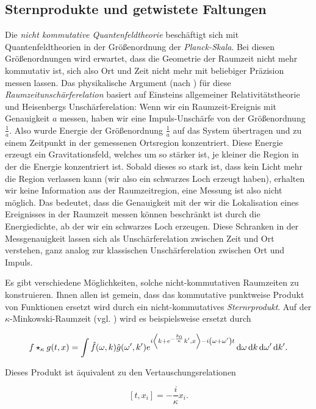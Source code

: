 \subsection{Sternprodukte und getwistete Faltungen}
Die \emph{nicht kommutative Quantenfeldtheorie} beschäftigt sich mit Quantenfeldtheorien in der Größenordnung der \emph{Planck-Skala}. Bei diesen Größenordnungen wird erwartet, dass die Geometrie der Raumzeit nicht mehr kommutativ ist, sich also Ort und Zeit nicht mehr mit beliebiger Präzision messen lassen. Das physikalische Argument (nach \textcite{Doplicher1995}) für diese \emph{Raumzeitunschärferelation} basiert auf Einsteins allgemeiner Relativitätstheorie und Heisenbergs Unschärferelation: Wenn wir ein Raumzeit-Ereignis mit Genauigkeit $a$ messen, haben wir eine Impuls-Unschärfe von der Größenordnung $\frac{1}{a}$. Also wurde Energie der Größenordnung $\frac{1}{a}$ auf das System übertragen und zu einem Zeitpunkt in der gemessenen Ortsregion konzentriert. Diese Energie erzeugt ein Gravitationsfeld, welches um so stärker ist, je kleiner die Region in der die Energie konzentriert ist. Sobald dieses so stark ist, dass kein Licht mehr die Region verlassen kann (wir also ein schwarzes Loch erzeugt haben), erhalten wir keine Information aus der Raumzeitregion, eine Messung ist also nicht möglich. Das bedeutet, dass die Genauigkeit mit der wir die Lokalisation eines Ereignisses in der Raumzeit messen können beschränkt ist durch die Energiedichte, ab der wir ein schwarzes Loch erzeugen. Diese Schranken in der Messgenauigkeit lassen sich als Unschärferelation zwischen Zeit und Ort verstehen, ganz analog zur klassischen Unschärferelation zwischen Ort und Impuls.

Es gibt verschiedene Möglichkeiten, solche nicht-kommutativen Raumzeiten zu konstruieren. Ihnen allen ist gemein, dass das kommutative punktweise Produkt von Funktionen ersetzt wird durch ein nicht-kommutatives \emph{Sternrprodukt}.
Auf der $\kappa$-Minkowski-Raumzeit (vgl. \textcite{kappaMinkowski}) wird es beispielsweise ersetzt durch

\begin{equation*}
    f \star_\kappa g (t,x) =
    \int \hat f(\omega,k) \hat g(\omega',k')
    e^{i \left<k + e^{-\frac{k_0}{\kappa}}k',x\right> - i\left(\omega+\omega' \right)t}
    \mathop{}\!\mathrm{d} \omega \mathop{}\!\mathrm{d} k \mathop{}\!\mathrm{d} \omega' \mathop{}\!\mathrm{d} k'.
\end{equation*}

Dieses Produkt ist äquivalent zu den Vertauschungsrelationen

\begin{equation*}
    \left[t,x_i\right] = -\frac{i}{\kappa} x_i.
\end{equation*}


